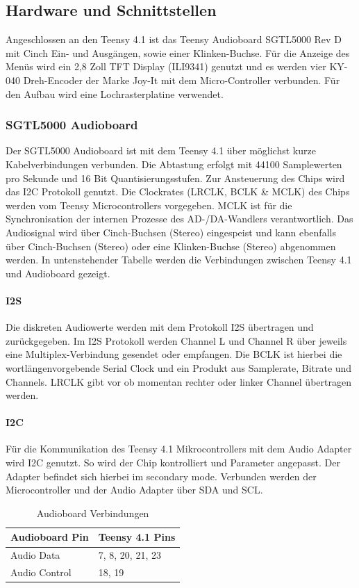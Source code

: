 \documentclass[12pt]{article}
\begin{document}
\subsection{Hardware und Schnittstellen}
Angeschlossen an den Teensy 4.1 ist das Teensy Audioboard SGTL5000 Rev D mit Cinch Ein- und Ausgängen, sowie einer Klinken-Buchse. 
Für die Anzeige des Menüs wird ein 2,8 Zoll TFT Display (ILI9341) 
genutzt und es werden vier KY-040 Dreh-Encoder der Marke Joy-It mit dem Micro-Controller verbunden. 
Für den Aufbau wird eine Lochrasterplatine verwendet. 

\subsubsection{SGTL5000 Audioboard}
Der SGTL5000 Audioboard ist mit dem Teensy 4.1 über möglichst kurze Kabelverbindungen verbunden. 
Die Abtastung erfolgt mit 44100 Samplewerten pro Sekunde und 16 Bit Quantisierungsstufen. 
Zur Ansteuerung des Chips wird das I2C Protokoll genutzt. 
Die Clockrates (LRCLK, BCLK \& MCLK) des Chips werden vom Teensy Microcontrollers vorgegeben. 
MCLK ist für die Synchronisation der internen Prozesse des AD-/DA-Wandlers verantwortlich.
Das Audiosignal wird über Cinch-Buchsen (Stereo) eingespeist und kann 
ebenfalls über Cinch-Buchsen (Stereo) oder eine Klinken-Buchse (Stereo) abgenommen werden.
In untenstehender Tabelle werden die Verbindungen zwischen Teensy 4.1 und Audioboard gezeigt.  
\paragraph{I2S}
Die diskreten Audiowerte werden mit dem Protokoll I2S übertragen und zurückgegeben. 
Im I2S Protokoll werden Channel L und Channel R über jeweils eine Multiplex-Verbindung gesendet oder empfangen. 
Die BCLK ist hierbei die wortlängenvorgebende Serial Clock und ein Produkt aus Samplerate, Bitrate und Channels. 
LRCLK gibt vor ob momentan rechter oder linker Channel übertragen werden. 
\paragraph{I2C}
Für die Kommunikation des Teensy 4.1 Mikrocontrollers mit dem Audio Adapter wird I2C genutzt. So wird der Chip kontrolliert und Parameter angepasst. 
Der Adapter befindet sich hierbei im \glq secondary mode\grq{}. Verbunden werden der Microcontroller und der Audio Adapter über SDA und SCL. 

\begin{table}[h]
  \centering
  \caption{Audioboard Verbindungen}
  \label{tbl:audioboardverbindungen}
  \begin{tabular}{l|l}
    \textbf{Audioboard Pin}  & \textbf{Teensy 4.1 Pins}\\
    \hline
    Audio Data & 7, 8, 20, 21, 23\\
 
    Audio Control	 & 18, 19\\
 
   

  \end{tabular}    

\end{table}
\end{document}
